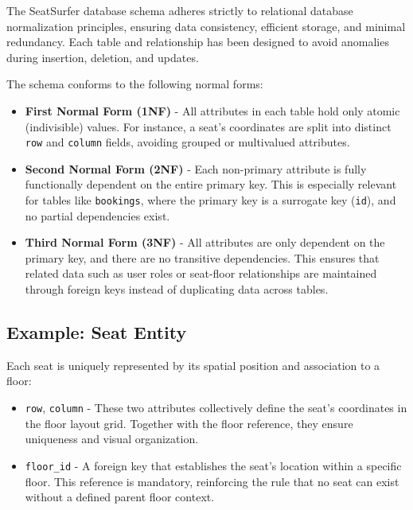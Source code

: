 \documentclass[12pt,a4paper]{report}
\begin{document}
The SeatSurfer database schema adheres strictly to relational database normalization principles, ensuring data consistency, efficient storage, and minimal redundancy. Each table and relationship has been designed to avoid anomalies during insertion, deletion, and updates.

The schema conforms to the following normal forms:

\begin{itemize}
    \item \textbf{First Normal Form (1NF)} - All attributes in each table hold only atomic (indivisible) values. For instance, a seat's coordinates are split into distinct \texttt{row} and \texttt{column} fields, avoiding grouped or multivalued attributes.
    
    \item \textbf{Second Normal Form (2NF)} - Each non-primary attribute is fully functionally dependent on the entire primary key. This is especially relevant for tables like \texttt{bookings}, where the primary key is a surrogate key (\texttt{id}), and no partial dependencies exist.

    \item \textbf{Third Normal Form (3NF)} - All attributes are only dependent on the primary key, and there are no transitive dependencies. This ensures that related data such as user roles or seat-floor relationships are maintained through foreign keys instead of duplicating data across tables.
\end{itemize}

\subsection*{Example: Seat Entity}

Each seat is uniquely represented by its spatial position and association to a floor:

\begin{itemize}
    \item \texttt{row}, \texttt{column} - These two attributes collectively define the seat's coordinates in the floor layout grid. Together with the floor reference, they ensure uniqueness and visual organization.
    
    \item \texttt{floor\_id} - A foreign key that establishes the seat's location within a specific floor. This reference is mandatory, reinforcing the rule that no seat can exist without a defined parent floor context.
\end{itemize}
\end{document}
